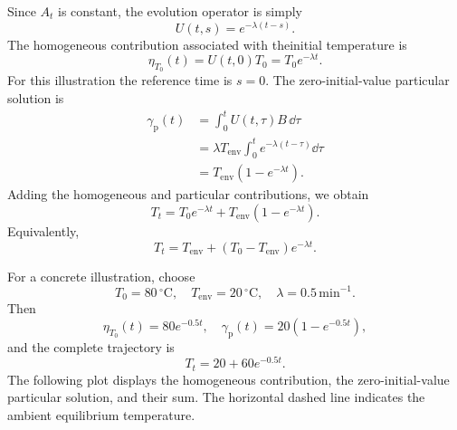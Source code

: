 \documentclass[12pt,a4paper,oneside]{book}
\begin{document}
\begin{example}
Since $A_t$ is constant, the evolution operator is simply
\begin{equation*}
    U(t,s)=e^{-\lambda(t-s)}.
\end{equation*}
The homogeneous contribution associated with theinitial temperature is
\begin{equation*}
    \eta_{T_0}(t)=U(t,0)T_0=T_0e^{-\lambda t}.
\end{equation*}
For this illustration the reference time is $s=0$. The zero-initial-value particular solution is
\begin{equation*}
    \begin{aligned}
        \gamma_{\mathrm p}(t) &= \int_0^tU(t,\tau)B\,\dd\tau\\
            &= \lambda T_{\mathrm{env}} \int_0^t e^{-\lambda(t-\tau)}\dd\tau\\
            &= T_{\mathrm{env}} \left(1-e^{-\lambda t}\right).
    \end{aligned}
\end{equation*}
Adding the homogeneous and particular contributions, we obtain
\begin{equation*}
    T_t = T_0e^{-\lambda t} + T_{\mathrm{env}} \left(1-e^{-\lambda t}\right).
\end{equation*}
Equivalently,
\begin{equation*}
    T_t = T_{\mathrm{env}} + (T_0-T_{\mathrm{env}})e^{-\lambda t}.
\end{equation*}

For a concrete illustration, choose
\begin{equation*}
    T_0=80\,^\circ\mathrm C, \quad
    T_{\mathrm{env}}=20\,^\circ\mathrm C, \quad
    \lambda=0.5\,\mathrm{min}^{-1}.
\end{equation*}
Then
\begin{equation*}
    \eta_{T_0}(t)=80e^{-0.5t}, \quad \gamma_{\mathrm p}(t)=20(1-e^{-0.5t}),
\end{equation*}
and the complete trajectory is
\begin{equation*}
    T_t=20+60e^{-0.5t}.
\end{equation*}
The following plot displays the homogeneous contribution, the zero-initial-value particular solution, and their sum. The
horizontal dashed line indicates the ambient equilibrium temperature.

\begin{center}
\end{center}
\end{example}
\end{document}
